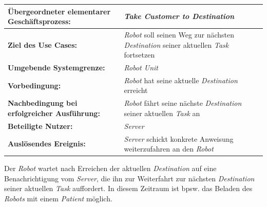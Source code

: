 			\begin{table}[H]
				\centering
				\begin{tabularx}{\textwidth}{|p{5cm}|X|}
					\hline
					\textbf{Übergeordneter elementarer Geschäftsprozess:} & \emph{Take Customer to Destination}  \\ \hline
					\textbf{Ziel des Use Cases:} & \emph{Robot} soll seinen Weg zur nächsten \emph{Destination} seiner aktuellen \emph{Task} fortsetzen \\ \hline
					\textbf{Umgebende Systemgrenze:} & \emph{Robot Unit} \\ \hline
					\textbf{Vorbedingung:} & \emph{Robot} hat seine aktuelle \emph{Destination} erreicht \\ \hline
					\textbf{Nachbedingung bei erfolgreicher Ausführung:} & \emph{Robot} fährt seine nächste \emph{Destination} seiner aktuellen \emph{Task} an \\ \hline
					\textbf{Beteiligte Nutzer:} & \emph{Server} \\ \hline
					\textbf{Auslösendes Ereignis:} & \emph{Server} schickt konkrete Anweisung weiterzufahren an den \emph{Robot} \\
					\hline
				\end{tabularx}
			\end{table}
			
			Der \emph{Robot} wartet nach Erreichen der aktuellen \emph{Destination} auf eine Benachrichtigung vom \emph{Server}, die ihn zur Weiterfahrt zur nächsten \emph{Destination} seiner aktuellen \emph{Task} auffordert. In diesem Zeitraum ist bpsw. das Beladen des \emph{Robots} mit einem \emph{Patient} möglich.
			
			
